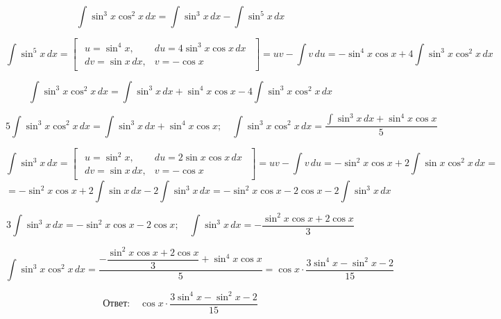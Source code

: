\[
\int \sin^3 x \cos^2 x\, dx = \int \sin^3 x\, dx - \int \sin^5 x\, dx
\]

\[
\int \sin^5 x\, dx =
    \begin{bmatrix}
        \begin{array}{ll}
            u = \sin^4 x, & du = 4\sin^3 x \cos x \,dx \\
            dv = \sin x \,dx, & v = -\cos x
        \end{array}
    \end{bmatrix} =
    uv - \int v\, du =
    -\sin^4 x \cos x + 4 \int \sin^3 x \cos^2 x\, dx
\]

\[
\int \sin^3 x \cos^2 x\, dx = \int \sin^3 x\, dx + \sin^4 x \cos x - 4 \int \sin^3 x \cos^2 x\, dx
\]

\[
5 \int \sin^3 x \cos^2 x\, dx = \int \sin^3 x\, dx + \sin^4 x \cos x; \quad 
\int \sin^3 x \cos^2 x\, dx = \frac{\int \sin^3 x\, dx + \sin^4 x \cos x}{5}
\]

\[
\int \sin^3 x\, dx =
    \begin{bmatrix}
        \begin{array}{ll}
            u = \sin^2 x, & du = 2\sin x \cos x \,dx \\
            dv = \sin x \,dx, & v = -\cos x
        \end{array}
    \end{bmatrix} =
    uv - \int v\, du =
    -\sin^2 x \cos x + 2 \int \sin x \cos^2 x\, dx =
\]
\[
= -\sin^2 x \cos x + 2 \int \sin x\, dx - 2 \int \sin^3 x\, dx = 
  -\sin^2 x \cos x - 2 \cos x - 2 \int \sin^3 x\, dx
\]

\[
3 \int \sin^3 x\, dx = -\sin^2 x \cos x - 2 \cos x; \quad 
\int \sin^3 x\, dx = - \dfrac{\sin^2 x \cos x + 2 \cos x}{3} 
\]

\[
\int \sin^3 x \cos^2 x\, dx =
\dfrac{- \dfrac{\sin^2 x \cos x + 2 \cos x}{3} + \sin^4 x \cos x}{5} = 
\cos x \cdot \dfrac{3 \sin^4 x - \sin^2 x - 2}{15}
\]

\[
\textbf{Ответ:} \quad \cos x \cdot \dfrac{3 \sin^4 x - \sin^2 x - 2}{15}
\]
